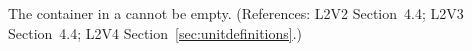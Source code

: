 The  container in a \UnitDefinition cannot be
empty.  (References: L2V2 Section~4.4; L2V3 Section~4.4; L2V4 Section~\ref{sec:unitdefinitions}.)
